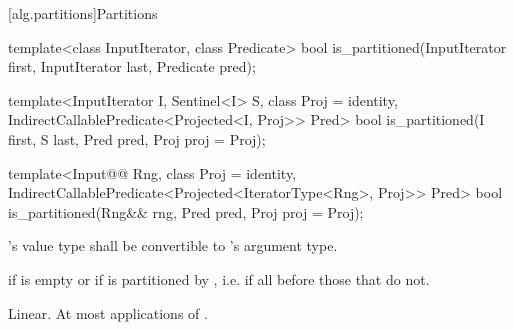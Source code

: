 [alg.partitions]{Partitions}

%
\begin{removedblock}
\begin{itemdecl}
template<class InputIterator, class Predicate>
  bool is_partitioned(InputIterator first, InputIterator last, Predicate pred);
\end{itemdecl}
\end{removedblock}
\begin{addedblock}
\begin{itemdecl}
template<InputIterator I, Sentinel<I> S, class Proj = identity,
    IndirectCallablePredicate<Projected<I, Proj>> Pred>
  bool is_partitioned(I first, S last, Pred pred, Proj proj = Proj{});

template<Input@@ Rng, class Proj = identity,
    IndirectCallablePredicate<Projected<IteratorType<Rng>, Proj>> Pred>
  bool
    is_partitioned(Rng&& rng, Pred pred, Proj proj = Proj{});
\end{itemdecl}
\end{addedblock}

\begin{itemdescr}
\begin{removedblock}
\pnum
\requires {}'s value type shall be convertible to 's argument type.
\end{removedblock}

\pnum
\returns {} if
 is empty or if
 is partitioned by , i.e. if all
 before those that do not.

\pnum
\complexity Linear. At most  applications of .
\end{itemdescr}

